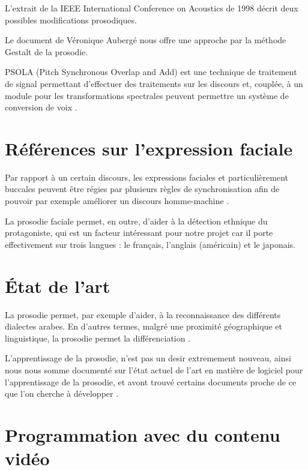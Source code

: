 L'extrait de la IEEE International Conference on Acoustics de 1998 \cite{Acero:ICASSP98-II-881} décrit deux possibles modifications prosodiques.

Le document de Véronique Aubergé \cite{auberge2002gestalt} nous offre une approche par la méthode Gestalt de la prosodie.

PSOLA (Pitch Synchronous Overlap and Add) est une technique de traitement de signal permettant d'effectuer des traitements sur les discours et, couplée, à un module pour les transformations spectrales peuvent permettre un système de conversion de voix \cite{valbret1992voice}.

\section{Références sur l'expression faciale}\label{ref_transfo_faciales}

Par rapport à un certain discours, les expressions faciales et particulièrement buccales peuvent être régies par plusieurs règles de synchronisation afin de pouvoir par exemple améliorer un discours homme-machine \cite{beskow1995rule} .

La prosodie faciale permet, en outre, d'aider à la détection ethnique du protagoniste, qui est un facteur intéressant pour notre projet car il porte effectivement sur trois langues : le français, l'anglais (américain) et le japonais\cite{matsumoto1992american}.


\section{État de l'art}\label{state_of_the_art}

La prosodie permet, par exemple d'aider, à la reconnaissance des différents dialectes arabes. En d'autres termes, malgré une proximité géographique et linguistique, la prosodie permet la différenciation \cite{rouas2006identification}.

L'apprentissage de la prosodie, n'est pas un desir extremement nouveau, ainsi nous nous somme documenté sur l'état actuel de l'art en matière de logiciel pour l'apprentissage de la prosodie, et avont trouvé certains documents proche de ce que l'on cherche à développer \cite{10.4000/alsic.332}. 

\section{Programmation avec du contenu vidéo}

